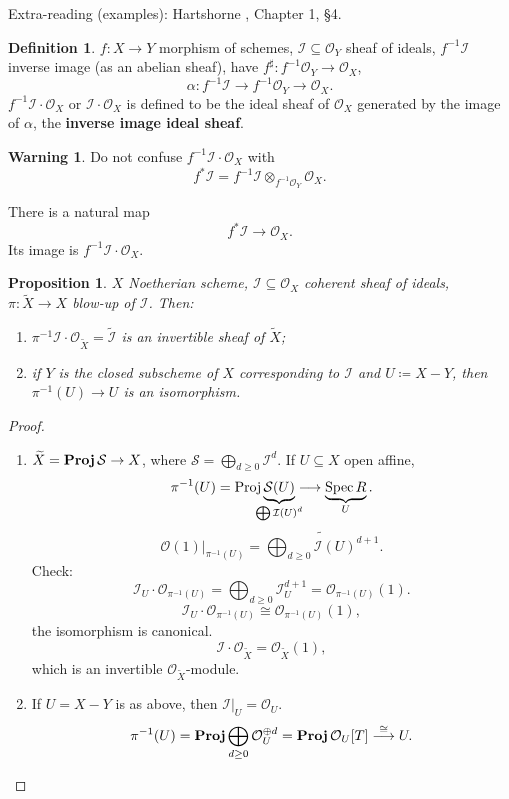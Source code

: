 \documentclass[12pt]{article}
\DeclareMathOperator{\Spec}{Spec}
\DeclareMathOperator{\Proj}{Proj}
\DeclareMathOperator{\relProj}{\textnormal{\textbf{Proj}}}
\newtheorem*{proposition}{Proposition}
\theoremstyle{definition}
\newtheorem*{definition}{Definition}
\newtheorem*{warning}{Warning}
\begin{document}
Extra-reading (examples): Hartshorne \cite{hartshorne2013algebraic}, Chapter 1, \S 4.

\begin{definition}
$f:X\rightarrow Y$ morphism of schemes, $\mathcal{I}\subseteq\mathcal{O}_Y$ sheaf of ideals, $f^{-1}\mathcal{I}$ inverse image (as an abelian sheaf), have $f^{\sharp}:f^{-1}\mathcal{O}_Y\rightarrow\mathcal{O}_X$,
\[\alpha:f^{-1}\mathcal{I}\longrightarrow f^{-1}\mathcal{O}_Y\longrightarrow\mathcal{O}_X.\]
$f^{-1}\mathcal{I}\cdot\mathcal{O}_X$ or $\mathcal{I}\cdot\mathcal{O}_X$ is defined to be the ideal sheaf of $\mathcal{O}_X$ generated by the image of $\alpha$, the \textbf{inverse image ideal sheaf}.
\end{definition}

\begin{warning}
Do not confuse $f^{-1}\mathcal{I}\cdot\mathcal{O}_X$ with
\[f^*\mathcal{I}=f^{-1}\mathcal{I}\otimes_{f^{-1}\mathcal{O}_Y}\mathcal{O}_X.\]

There is a natural map
\[f^*\mathcal{I}\longrightarrow\mathcal{O}_X.\]
Its image is $f^{-1}\mathcal{I}\cdot\mathcal{O}_X$.
\end{warning}

\begin{proposition}
$X$ Noetherian scheme, $\mathcal{I}\subseteq\mathcal{O}_X$ coherent sheaf of ideals, $\pi:\widetilde{X}\rightarrow X$ blow-up of $\mathcal{I}$. Then:
\begin{enumerate}[label=\arabic*)]
\item $\pi^{-1}\mathcal{I}\cdot\mathcal{O}_{\widetilde{X}}=\widetilde{\mathcal{I}}$ is an invertible sheaf of $\widetilde{X}$;
\item if $Y$ is the closed subscheme of $X$ corresponding to $\mathcal{I}$ and $U\coloneqq X-Y$, then $\pi^{-1}(U)\rightarrow U$ is an isomorphism.
\end{enumerate}
\end{proposition}

\begin{proof}
\begin{enumerate}[label=\arabic*)]
\item $\widetilde{X}=\relProj\mathcal{S}\rightarrow X$, where $\mathcal{S}=\bigoplus_{d\geq0}\mathcal{I}^d$. If $U\subseteq X$ open affine,
\[\pi^{-1}(U)=\Proj\underbrace{\mathcal{S}(U)}_{\mathclap{\bigoplus\mathcal{I}(U)^d}}\longrightarrow\underbrace{\Spec R}_U.\]
\[\mathcal{O}(1)|_{\pi^{-1}(U)}=\widetilde{\bigoplus_{d\geq0}\mathcal{I}(U)^{d+1}}.\]
Check:
\[\mathcal{I}_U\cdot\mathcal{O}_{\pi^{-1}(U)}=\bigoplus_{d\geq0}\mathcal{I}_U^{d+1}=\mathcal{O}_{\pi^{-1}(U)}(1).\]
\[\mathcal{I}_U\cdot\mathcal{O}_{\pi^{-1}(U)}\cong\mathcal{O}_{\pi^{-1}(U)}(1),\]
the isomorphism is canonical.
\[\mathcal{I}\cdot\mathcal{O}_{\widetilde{X}}=\mathcal{O}_{\widetilde{X}}(1),\]
which is an invertible $\mathcal{O}_{\widetilde{X}}$-module.

\item If $U=X-Y$ is as above, then $\mathcal{I}|_U=\mathcal{O}_U$.
\[\pi^{-1}(U)=\relProj\bigoplus_{d\geq0}\mathcal{O}_U^{\oplus d}=\relProj\mathcal{O}_U[T]\overset{\cong}{\longrightarrow}U.\]
\end{enumerate}
\end{proof}
\end{document}
